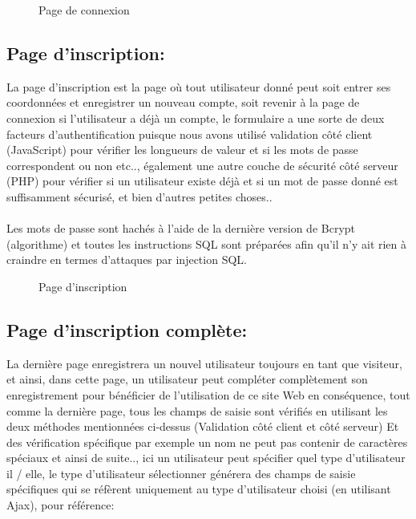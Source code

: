 \documentclass[12pt]{report}
\begin{document}
\vspace{0.5in}

\begin{figure}[h]
\centering
  \hspace*{-0.33in}
\caption{Page de connexion}
\end{figure}

\newpage

\subsection{Page d'inscription:}

\vspace{0.2in}

La page d'inscription est la page où tout utilisateur donné peut soit entrer ses coordonnées et enregistrer un nouveau compte, soit revenir à la page de connexion si l'utilisateur a déjà un compte, le formulaire a une sorte de deux facteurs d'authentification puisque nous avons utilisé validation côté client (JavaScript) pour vérifier les longueurs de valeur et si les mots de passe correspondent ou non etc.., également une autre couche de sécurité côté serveur (PHP) pour vérifier si un utilisateur existe déjà et si un mot de passe donné est suffisamment sécurisé, et bien d'autres petites choses..
\\\\
Les mots de passe sont hachés à l'aide de la dernière version de Bcrypt (algorithme) et toutes les instructions SQL sont préparées afin qu'il n'y ait rien à craindre en termes d'attaques par injection SQL.

\vspace{0.5in}

\begin{figure}[h]
\centering
  \hspace*{-0.33in}
\caption{Page d'inscription}
\end{figure}

\newpage

\subsection{Page d'inscription complète:}

La dernière page enregistrera un nouvel utilisateur toujours en tant que visiteur, et ainsi, dans cette page, un utilisateur peut compléter complètement son enregistrement pour bénéficier de l'utilisation de ce site Web en conséquence, tout comme la dernière page, tous les champs de saisie sont vérifiés en utilisant les deux méthodes mentionnées ci-dessus (Validation côté client et côté serveur) Et des vérification spécifique par exemple un nom ne peut pas contenir de caractères spéciaux et ainsi de suite.., ici un utilisateur peut spécifier quel type d'utilisateur il / elle, le type d'utilisateur sélectionner générera des champs de saisie spécifiques qui se réfèrent uniquement au type d'utilisateur choisi (en utilisant Ajax), pour référence:
\end{document}
